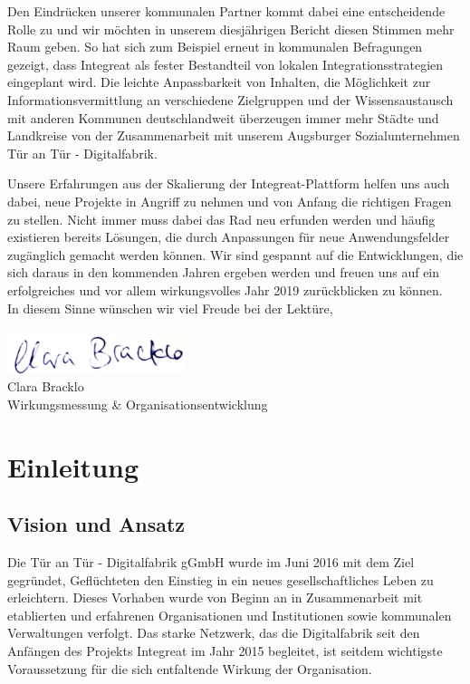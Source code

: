 \documentclass[12pt, a4paper]{article} %
\begin{document}
Den Eindrücken unserer kommunalen Partner kommt dabei eine entscheidende
Rolle zu und wir möchten in unserem diesjährigen Bericht diesen Stimmen
mehr Raum geben. So hat sich zum Beispiel erneut in kommunalen
Befragungen gezeigt, dass Integreat als fester Bestandteil von lokalen
Integrationsstrategien eingeplant wird. Die leichte Anpassbarkeit von
Inhalten, die Möglichkeit zur Informationsvermittlung an verschiedene
Zielgruppen und der Wissensaustausch mit anderen Kommunen
deutschlandweit überzeugen immer mehr Städte und Landkreise von der
Zusammenarbeit mit unserem Augsburger Sozialunternehmen Tür an Tür -
Digitalfabrik.

Unsere Erfahrungen aus der Skalierung der Integreat-Plattform helfen uns
auch dabei, neue Projekte in Angriff zu nehmen und von Anfang die
richtigen Fragen zu stellen. Nicht immer muss dabei das Rad neu erfunden
werden und häufig existieren bereits Lösungen, die durch Anpassungen für
neue Anwendungsfelder zugänglich gemacht werden können. Wir sind
gespannt auf die Entwicklungen, die sich daraus in den kommenden Jahren
ergeben werden und freuen uns auf ein erfolgreiches und vor allem
wirkungsvolles Jahr 2019 zurückblicken zu können.\\

\noindent In diesem Sinne wünschen wir viel Freude bei der Lektüre,\\\\
\includegraphics[width=2.03896in]{figure/Unterschrift_clara.jpg}\\
Clara Bracklo\\
Wirkungsmessung \& Organisationsentwicklung

\hypertarget{einleitung}{%
\section{Einleitung}\label{einleitung}}

\hypertarget{vision-und-ansatz}{%
\subsection{Vision und Ansatz}\label{vision-und-ansatz}}

Die Tür an Tür - Digitalfabrik gGmbH wurde im Juni 2016 mit dem Ziel
gegründet, Geflüchteten den Einstieg in ein neues gesellschaftliches
Leben zu erleichtern. Dieses Vorhaben wurde von Beginn an in
Zusammenarbeit mit etablierten und erfahrenen Organisationen und
Institutionen sowie kommunalen Verwaltungen verfolgt. Das starke
Netzwerk, das die Digitalfabrik seit den Anfängen des Projekts Integreat
im Jahr 2015 begleitet, ist seitdem wichtigste Voraussetzung für die
sich entfaltende Wirkung der Organisation.
\end{document}
